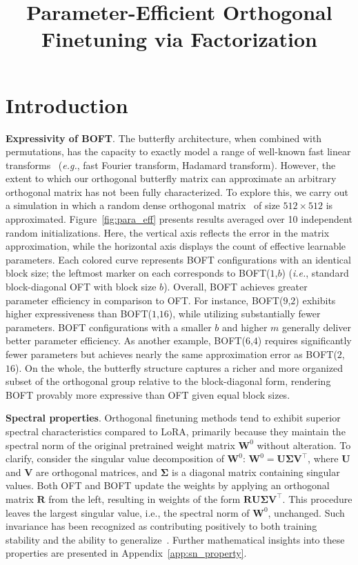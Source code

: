 \title{Parameter-Efficient Orthogonal Finetuning via Factorization}
\section{Introduction}

\textbf{Expressivity of BOFT}. The butterfly architecture, when combined with permutations, has the capacity to exactly model a range of well-known fast linear transforms~\cite{dao2019learning,dao2019kaleidoscope} (\emph{e.g.}, fast Fourier transform, Hadamard transform). However, the extent to which our orthogonal butterfly matrix can approximate an arbitrary orthogonal matrix has not been fully characterized. To explore this, we carry out a simulation in which a random dense orthogonal matrix~\cite{anderson1987generation} of size $512\times 512$ is approximated. Figure~\ref{fig:para_eff} presents results averaged over 10 independent random initializations. Here, the vertical axis reflects the error in the matrix approximation, while the horizontal axis displays the count of effective learnable parameters. Each colored curve represents BOFT configurations with an identical block size; the leftmost marker on each corresponds to BOFT($1$,$b$) (\emph{i.e.}, standard block-diagonal OFT with block size $b$). Overall, BOFT achieves greater parameter efficiency in comparison to OFT. For instance, BOFT($9$,$2$) exhibits higher expressiveness than BOFT($1$,$16$), while utilizing substantially fewer parameters. BOFT configurations with a smaller $b$ and higher $m$ generally deliver better parameter efficiency. As another example, BOFT($6$,$4$) requires significantly fewer parameters but achieves nearly the same approximation error as BOFT($2$,$16$). On the whole, the butterfly structure captures a richer and more organized subset of the orthogonal group relative to the block-diagonal form, rendering BOFT provably more expressive than OFT given equal block sizes.

\textbf{Spectral properties}. Orthogonal finetuning methods tend to exhibit superior spectral characteristics compared to LoRA, primarily because they maintain the spectral norm of the original pretrained weight matrix $\bm{W}^0$ without alteration. To clarify, consider the singular value decomposition of $\bm{W}^0$: $\bm{W}^0=\bm{U}\bm{\Sigma}\bm{V}^\top$, where $\bm{U}$ and $\bm{V}$ are orthogonal matrices, and $\bm{\Sigma}$ is a diagonal matrix containing singular values. Both OFT and BOFT update the weights by applying an orthogonal matrix $\bm{R}$ from the left, resulting in weights of the form $\bm{R}\bm{U}\bm{\Sigma}\bm{V}^\top$. This procedure leaves the largest singular value, i.e., the spectral norm of $\bm{W}^0$, unchanged. Such invariance has been recognized as contributing positively to both training stability and the ability to generalize~\cite{miyato2018spectral,yoshida2017spectral}. Further mathematical insights into these properties are presented in Appendix~\ref{app:sn_property}.

